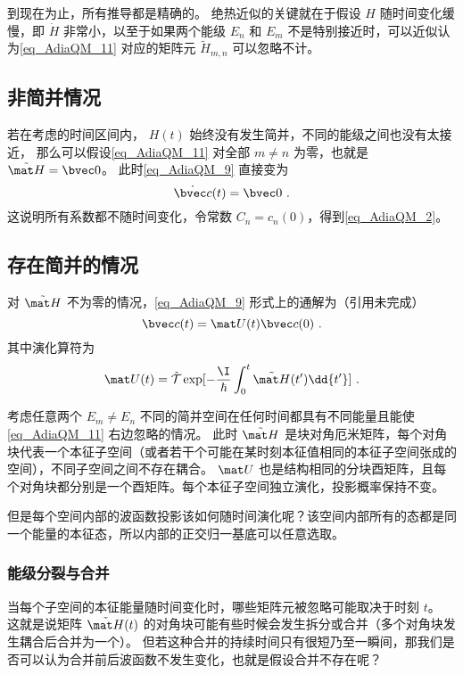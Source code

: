 到现在为止，所有推导都是精确的。 绝热近似的关键就在于假设 $H$ 随时间变化缓慢，即 $\dot H$ 非常小，以至于如果两个能级 $E_n$ 和 $E_m$ 不是特别接近时，可以近似认为\autoref{eq_AdiaQM_11} 对应的矩阵元 $\tilde H_{m,n}$ 可以忽略不计。

\subsection{非简并情况}
若在考虑的时间区间内， $H(t)$ 始终没有发生简并，不同的能级之间也没有太接近， 那么可以假设\autoref{eq_AdiaQM_11} 对全部 $m\ne n$ 为零，也就是 $\tilde{\mat H} = \bvec 0$。 此时\autoref{eq_AdiaQM_9} 直接变为
\begin{equation}
\dot{\bvec c}(t) = \bvec 0~.
\end{equation}
这说明所有系数都不随时间变化，令常数 $C_n = c_n(0)$，得到\autoref{eq_AdiaQM_2}。

\subsection{存在简并的情况}
对 $\tilde{\mat H}$ 不为零的情况，\autoref{eq_AdiaQM_9} 形式上的通解为（引用未完成）
\begin{equation}
\bvec c(t) = \mat U(t)\bvec c(0)~.
\end{equation}
其中演化算符为
\begin{equation}
\mat U(t) = \hat{\mathcal{T}}\exp[-\frac{\I}{\hbar}\int_0^t \tilde{\mat H}(t') \dd{t'}]~.
\end{equation}

考虑任意两个 $E_m\ne E_n$ 不同的简并空间在任何时间都具有不同能量且能使\autoref{eq_AdiaQM_11} 右边忽略的情况。 此时 $\tilde{\mat H}$ 是块对角厄米矩阵，每个对角块代表一个本征子空间（或者若干个可能在某时刻本征值相同的本征子空间张成的空间），不同子空间之间不存在耦合。 $\mat U$ 也是结构相同的分块酉矩阵，且每个对角块都分别是一个酉矩阵。每个本征子空间独立演化，投影概率保持不变。

但是每个空间内部的波函数投影该如何随时间演化呢？该空间内部所有的态都是同一个能量的本征态，所以内部的正交归一基底可以任意选取。

\subsubsection{能级分裂与合并}
当每个子空间的本征能量随时间变化时，哪些矩阵元被忽略可能取决于时刻 $t$。 这就是说矩阵 $\tilde{\mat H}(t)$ 的对角块可能有些时候会发生拆分或合并（多个对角块发生耦合后合并为一个）。 但若这种合并的持续时间只有很短乃至一瞬间，那我们是否可以认为合并前后波函数不发生变化，也就是假设合并不存在呢？

